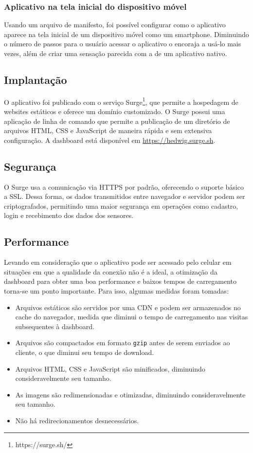 \subsubsection{Aplicativo na tela inicial do dispositivo móvel}

Usando um arquivo de manifesto, foi possível configurar como o aplicativo aparece na tela inicial de um dispositivo móvel como um smartphone. Diminuindo o número de passos para o usuário acessar o aplicativo o encoraja a usá-lo mais vezes, além de criar uma sensação parecida com a de um aplicativo nativo.

\subsection{Implantação}

O aplicativo foi publicado com o serviço Surge\footnote{https://surge.sh/}, que permite a hospedagem de websites estáticos e oferece um domínio customizado. O Surge possui uma aplicação de linha de comando que permite a publicação de um diretório de arquivos HTML, CSS e JavaScript de maneira rápida e sem extensiva configuração. A dashboard está disponível em \url{https://hedwig.surge.sh}.

\subsection{Segurança}

O Surge usa a comunicação via HTTPS por padrão, oferecendo o suporte básico a SSL. Dessa forma, os dados transmitidos entre navegador e servidor podem ser criptografados, permitindo uma maior segurança em operações como cadastro, login e recebimento dos dados dos sensores.

\subsection{Performance}

Levando em consideração que o aplicativo pode ser acessado pelo celular em situações em que a qualidade da conexão não é a ideal, a otimização da dashboard para obter uma boa performance e baixos tempos de carregamento torna-se um ponto importante. Para isso, algumas medidas foram tomadas:

\begin{itemize}
\item Arquivos estáticos são servidos por uma CDN e podem ser armazenados no cache do navegador, medida que diminui o tempo de carregamento nas visitas subsequentes à dashboard.
\item Arquivos são compactados em formato \texttt{gzip} antes de serem enviados ao cliente, o que diminui seu tempo de download.
\item Arquivos HTML, CSS e JavaScript são minificados, diminuindo consideravelmente seu tamanho.
\item As imagens são redimensionadas e otimizadas, diminuindo consideravelmente seu tamanho.
\item Não há redirecionamentos desnecessários.
\end{itemize}
